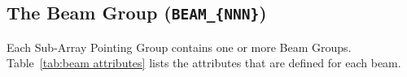 \documentclass[a4paper,10pt,bibtotoc]{scrartcl}
\begin{document}

\subsection{The Beam Group ({\tt BEAM\_\{NNN\}})}
\label{sec:Beam group}

Each Sub-Array Pointing Group contains one or more Beam Groups. Table~\ref{tab:beam attributes} lists the attributes that are defined for each beam.

\vspace{15pt}

\tablelasttail{\hline}
\end{document}
